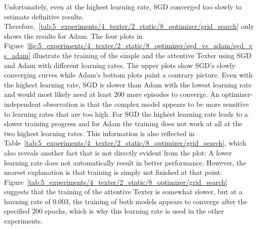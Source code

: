 Unfortunately, even at the highest learning rate, SGD converged too slowly to estimate definitive results. Therefore,~\ref{tab:5_experiments/4_texter/2_static/8_optimizer/grid_search} only shows the results for Adam. The four plots in Figure~\ref{fig:5_experiments/4_texter/2_static/8_optimizer/sgd_vs_adam/sgd_vs_adam} illustrate the training of the simple and the attentive Texter using SGD and Adam with different learning rates. The upper plots show SGD's slowly converging curves while Adam's bottom plots paint a contrary picture. Even with the highest learning rate, SGD is slower than Adam with the lowest learning rate and would most likely need at least 200 more episodes to converge. An optimizer-independent observation is that the complex model appears to be more sensitive to learning rates that are too high. For SGD the highest learning rate leads to a slower training progress and for Adam the training does not work at all at the two highest learning rates. This information is also reflected in Table~\ref{tab:5_experiments/4_texter/2_static/8_optimizer/grid_search}, which also reveals another fact that is not directly evident from the plot: A lower learning rate does not automatically result in better performance. However, the nearest explanation is that training is simply not finished at that point. Figure~\ref{tab:5_experiments/4_texter/2_static/8_optimizer/grid_search} suggests that the training of the attentive Texter is somewhat slower, but at a learning rate of 0.003, the training of both models appears to converge after the specified 200 epochs, which is why this learning rate is used in the other experiments.
